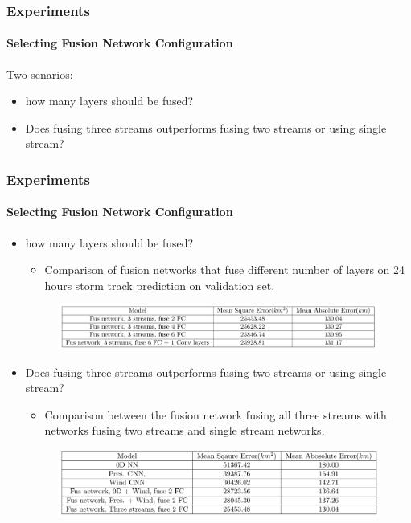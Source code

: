 \documentclass{beamer}
\begin{document}
\begin{frame}
\frametitle{Experiments}
\framesubtitle{Selecting Fusion Network Configuration}
Two senarios:
\begin{itemize}
	\item  how many layers should be fused?
	\item  Does fusing three streams outperforms fusing two streams or using single stream?
\end{itemize}
\end{frame}

\begin{frame}
\frametitle{Experiments}
\framesubtitle{Selecting Fusion Network Configuration}
\begin{itemize}
	\item  how many layers should be fused?
	\begin{itemize}
		\item Comparison of fusion networks that fuse different number of layers on 24 hours storm track prediction on validation set.
		
	\end{itemize}
	\begin{figure}
		\includegraphics[width=0.95\linewidth]{figs/fusion_1.png} \\
	\end{figure}
	\item  Does fusing three streams outperforms fusing two streams or using single stream?
	\begin{itemize}
		\item Comparison between the fusion network fusing all three streams with networks fusing two streams and single stream networks.
		
	\end{itemize}
	\begin{figure}
		\includegraphics[width=0.8\linewidth]{figs/fusion_2.png} \\
	\end{figure}
\end{itemize}
\end{frame}
\end{document}

